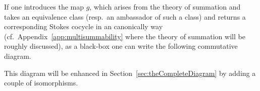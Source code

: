 If one introduces the map $g$, which arises from the theory of summation and
takes an equivalence class (resp.\ an ambassador of such a class) and returns a
corresponding Stokes cocycle in an canonically way
(cf.\ Appendix~\ref{app:multisummability} where the theory of summation  will
be roughly discussed), as a black-box one can write the following commutative
diagram.
\begin{center}
\end{center}\label{page:ofPreDiagram}
This diagram will be enhanced in Section~\ref{sec:theCompleteDiagram} by
adding a couple of isomorphisms.

